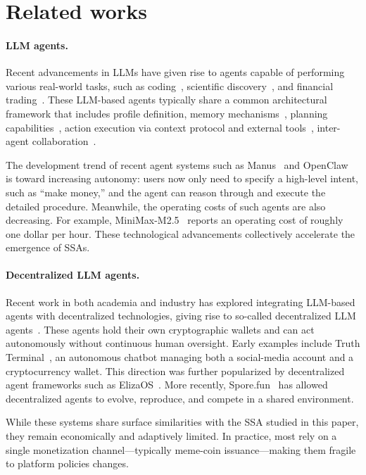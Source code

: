 \section{Related works}

\paragraph{LLM agents.} Recent advancements in LLMs have given rise to agents capable of performing various real-world tasks, such as coding~\cite{novikov2025alphaevolve}, scientific discovery~\cite{mcnaughton2024cactus}, and financial trading~\cite{zhang2024multimodal}. These LLM-based agents typically share a common architectural framework that includes profile definition, memory mechanisms~\cite{hatalis2023memory}, planning capabilities~\cite{huang2024understanding}, action execution via context protocol and external tools~\cite{lu2025toolsandbox}, inter-agent collaboration~\cite{hou2025model}. 

The development trend of recent agent systems such as Manus~\cite{manus} and OpenClaw~\cite{OpenClaw} is toward increasing autonomy: users now only need to specify a high-level intent, such as “make money,” and the agent can reason through and execute the detailed procedure. Meanwhile, the operating costs of such agents are also decreasing. For example, MiniMax-M2.5~\cite{minimax} reports an operating cost of roughly one dollar per hour. These technological advancements collectively accelerate the emergence of SSAs.




\paragraph{Decentralized LLM agents.}
Recent work in both academia and industry has explored integrating LLM-based agents with decentralized technologies, giving rise to so-called decentralized LLM agents~\cite{hu2025trustless}. These agents hold their own cryptographic wallets and can act autonomously without continuous human oversight. Early examples include Truth Terminal~\cite{truthterminal}, an autonomous chatbot managing both a social-media account and a cryptocurrency wallet. This direction was further popularized by decentralized agent frameworks such as ElizaOS~\cite{walters2025eliza}. More recently, Spore.fun~\cite{spore} has allowed decentralized agents to evolve, reproduce, and compete in a shared environment.

While these systems share surface similarities with the SSA studied in this paper, they remain economically and adaptively limited. In practice, most rely on a single monetization channel—typically meme-coin issuance—making them fragile to platform policies changes. 








